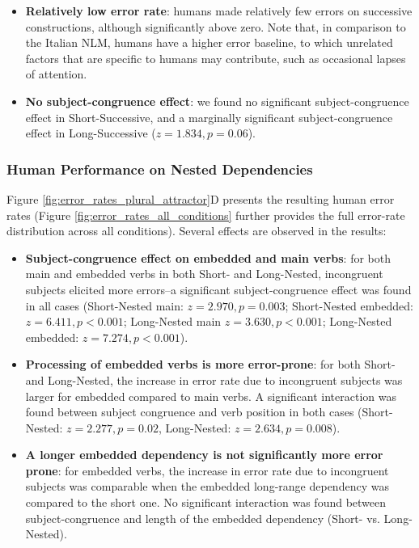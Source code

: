 \begin{itemize}
    \item \textbf{Relatively low error rate}: humans made relatively few errors on successive constructions, although significantly above zero. Note that, in comparison to the Italian NLM, humans have a higher error baseline, to which unrelated factors that are specific to humans may contribute, such as occasional lapses of attention.
    \item \textbf{No subject-congruence effect}: we found no significant subject-congruence effect in Short-Successive, and a marginally significant subject-congruence effect in Long-Successive ($z=1.834, p=0.06$).
\end{itemize}

\subsubsection{Human Performance on Nested Dependencies}
Figure \ref{fig:error_rates_plural_attractor}D presents the resulting human error rates (Figure \ref{fig:error_rates_all_conditions} further provides the full error-rate distribution across all conditions). Several effects are observed in the results:

\begin{itemize}
    \item \textbf{Subject-congruence effect on embedded and main verbs}: for both main and embedded verbs in both Short- and Long-Nested, incongruent subjects elicited more errors--a significant subject-congruence effect was found in all cases (Short-Nested main: $z=2.970, p=0.003$; Short-Nested embedded: $z=6.411, p<0.001$; Long-Nested main $z=3.630, p<0.001$; Long-Nested embedded: $z=7.274, p<0.001$).
    \item \textbf{Processing of embedded verbs is more error-prone}: for both Short- and Long-Nested, the increase in error rate due to incongruent subjects was larger for embedded compared to main verbs. A significant interaction was found between subject congruence and verb position in both cases (Short-Nested: $z=2.277, p = 0.02$, Long-Nested: $z=2.634, p = 0.008$).
    \item \textbf{A longer embedded dependency is not significantly more error prone}: for embedded verbs, the increase in error rate due to incongruent subjects was comparable when the embedded long-range dependency was compared to the short one. No significant interaction was found between subject-congruence and length of the embedded dependency (Short- vs. Long-Nested).
\end{itemize}

